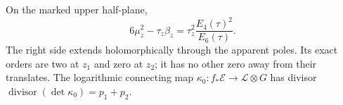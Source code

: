 \begin{proposition}\label{inv:A2.1}\label{wb:prop:log-ks-divisor}\label{wb:prop:period-derivative-determinant}
On the marked upper half-plane,
\begin{equation}\label{inv:eq:A-modular-K}
6\mu_z^2-\tau_z\beta_z
=\tau_z^2\frac{E_4(\tau)^2}{E_6(\tau)}.
\end{equation}
The right side extends holomorphically through the apparent poles.
Its exact orders are two at $z_1$ and zero at $z_2$; it has no other
zero away from their translates.  The logarithmic connecting map
$\kappa_0:f_*\mathcal E\to\mathcal L\otimes G$ has divisor
$\operatorname{divisor}(\det\kappa_0)=p_1+p_2$.
\end{proposition}

